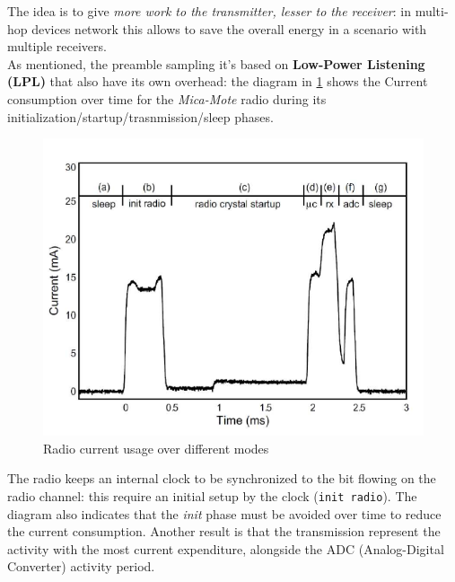 \documentclass[10pt,a4paper]{report}
\theoremstyle{definition}
\begin{document}
The idea is to give \textit{more work to the transmitter, lesser to the receiver}: in multi-hop devices network this allows to save the overall energy in a scenario with multiple receivers.\\

As mentioned, the preamble sampling it's based on \textbf{Low-Power Listening (LPL)} that also have its own overhead: the diagram in \ref{bmac-power} shows the Current consumption over time for the \textit{Mica-Mote} radio during its initialization/startup/trasnmission/sleep phases.
\begin{figure}[h]
	\centering\includegraphics[scale=0.40]{images/Pasted image 20230405104057.png}
	\caption{Radio current usage over different modes}
	\label{bmac-power}
\end{figure}


The radio keeps an internal clock to be synchronized to the bit flowing on the radio channel: this require an initial setup by the clock (\texttt{init radio}). The diagram also indicates that the \textit{init} phase must be avoided over time to reduce the current consumption. Another result is that the transmission represent the activity with the most current expenditure, alongside the ADC (Analog-Digital Converter) activity period.
\end{document}
